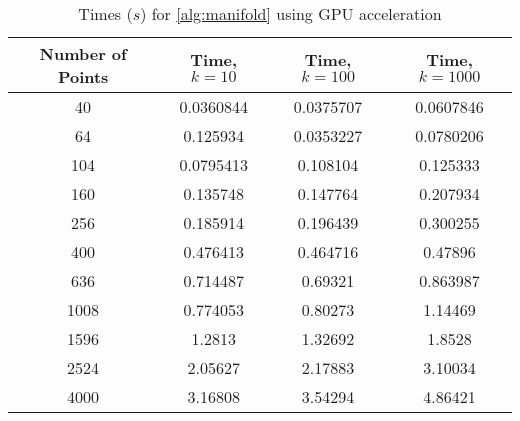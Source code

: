 \begin{table}[ht!]
    \centering
    {\footnotesize
        \begin{tabular}{| c | c c c |}
            \hline
            Number of Points & Time, $k=10$ & Time, $k=100$ & Time, $k=1000$ \\
            \hline
            40  &  0.0360844   &  0.0375707    &  0.0607846 \\
            64  &  0.125934    &  0.0353227    &  0.0780206 \\
            104  &  0.0795413   &  0.108104     &  0.125333 \\
            160  &  0.135748    &  0.147764     &  0.207934 \\
            256  &  0.185914    &  0.196439     &  0.300255 \\
            400  &  0.476413    &  0.464716     &  0.47896 \\
            636  &  0.714487    &  0.69321      &  0.863987 \\ 
            1008  &  0.774053    &  0.80273      &  1.14469 \\ 
            1596  &  1.2813      &  1.32692      &  1.8528 \\
            2524  &  2.05627     &  2.17883      &  3.10034 \\
            4000  &  3.16808     &  3.54294      &  4.86421 \\
            \hline
        \end{tabular}
    }
    \caption{Times ($s$) for \autoref{alg:manifold} using GPU acceleration}
    \label{tb:gpu}
\end{table}

